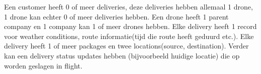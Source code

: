 \documentclass{exam}
\begin{document}
\begin{questions}
	Een customer heeft 0 of meer deliveries, deze deliveries hebben allemaal 1 drone, 1 drone kan echter 0 of meer deliveries hebben.
	Een drone heeft 1 parent company en 1 company kan 1 of meer drones hebben. Elke delivery heeft 1 record voor weather conditions, route informatie(tijd die route heeft geduurd etc.). Elke delivery heeft 1 of meer packages en twee locations(source, destination). Verder kan een delivery status updates hebben (bijvoorbeeld huidige locatie) die op worden geslagen in flight.
\end{questions}
\end{document}
